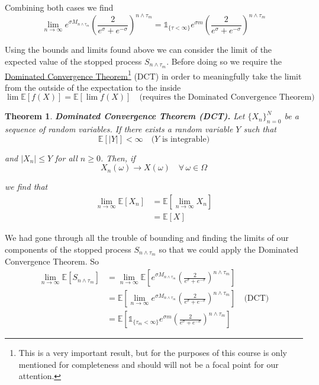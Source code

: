 \documentclass[12pt]{article}
\newtheorem{theorem}{Theorem}
\newlength\tindent
\renewcommand{\indent}{\hspace*{\tindent}}
\newcommand{\E}{\mathbb E}
\begin{document}
Combining both cases we find
\begin{equation*}
	\lim_{n\to\infty} e^{\sigma M_{n\land\tau_m}} \left( \frac{2}{e^\sigma + e^{-\sigma} } \right)^{n\land\tau_m} = \mathds 1_{\{\tau < \infty\}} e^{\sigma m} \left( \frac{2}{e^\sigma + e^{-\sigma} } \right)^{n\land\tau_m}
\end{equation*}

\indent Using the bounds and limits found above we can consider the limit of the expected value of the stopped process $S_{n\land\tau_m}$. Before doing so we require the \underline{Dominated Convergence Theorem}\footnote{This is a very important result, but for the purposes of this course is only mentioned for completeness and should will not be a focal point for our attention.} (DCT) in order to meaningfully take the limit from the outside of the expectation to the inside
\begin{equation*}
	\lim \E[ f(X) ] = \E[\lim f(X)] \quad \text{(requires the Dominated Convergence Theorem)}
\end{equation*}

\begin{theorem}{\bf Dominated Convergence Theorem (DCT).} Let $\{X_n\}^N_{n = 0}$ be a sequence of random variables. If there exists a random variable $Y$ such that
\begin{equation*}
	\E[|Y|] < \infty \quad \text{($Y$ is integrable)} 
\end{equation*}

and $|X_n| \leq Y$ for all $n \geq 0$. Then, if 
\begin{equation*}
	X_n(\omega) \longrightarrow X(\omega) \quad \forall\,\omega\in\Omega
\end{equation*}

we find that
\begin{align*}
	\lim_{n\to\infty} \E[X_n] &= \E[ \lim_{n\to\infty} X_n ] \\
	&= \E[X]
\end{align*}
\end{theorem}

\indent We had gone through all the trouble of bounding and finding the limits of our components of the stopped process $S_{n\land\tau_m}$ so that we could apply the Dominated Convergence Theorem. So
\begin{align*}
	\lim_{n\to \infty} \E[S_{n\land\tau_m}] &= \lim_{n\to\infty} \E \left[ e^{\sigma M_{n\land\tau_m}} \left( \frac{2}{e^\sigma + e^{-\sigma}} \right)^{n\land\tau_m} \right] \\
	&= \E \left[ \lim_{n\to\infty} e^{\sigma M_{n\land\tau_m}} \left( \frac{2}{e^\sigma + e^{-\sigma}} \right)^{n\land\tau_m} \right] \quad \text{(DCT)} \\
	&= \E \left[ \mathds 1_{\{\tau_m < \infty\}} e^{\sigma m} \left( \frac{2}{e^\sigma + e^{-\sigma} } \right)^{n\land\tau_m} \right] 
\end{align*}
\end{document}

